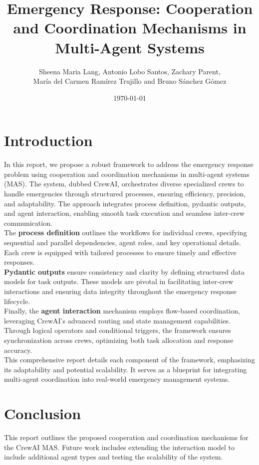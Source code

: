 \documentclass[12pt,a4paper]{article}
\title{Emergency Response: Cooperation and Coordination Mechanisms in Multi-Agent Systems}
\author{Sheena Maria Lang, Antonio Lobo Santos, Zachary Parent, \\ María del Carmen Ramírez Trujillo and Bruno Sánchez Gómez}
\date{\today}
\begin{document}
\maketitle
\tableofcontents
\newpage

\section{Introduction}
In this report, we propose a robust framework to address the emergency response problem using cooperation and coordination
 mechanisms in multi-agent systems (MAS). The system, dubbed CrewAI, orchestrates diverse specialized crews to handle emergencies
  through structured processes, ensuring efficiency, precision, and adaptability. The approach integrates process definition, 
  pydantic outputs, and agent interaction, enabling smooth task execution and seamless inter-crew communication.
\\

The \textbf{process definition} outlines the workflows for individual crews, specifying sequential and parallel dependencies, agent roles,
 and key operational details. Each crew is equipped with tailored processes to ensure timely and effective responses.
\\ 

\textbf{Pydantic outputs} ensure consistency and clarity by defining structured data models for task outputs. These models are
 pivotal in facilitating inter-crew interactions and ensuring data integrity throughout the emergency response lifecycle.
\\ 

Finally, the \textbf{agent interaction} mechanism employs flow-based coordination, leveraging CrewAI’s advanced routing and state 
management capabilities. Through logical operators and conditional triggers, the framework ensures synchronization across crews, 
optimizing both task allocation and response accuracy.
\\ 

This comprehensive report details each component of the framework, emphasizing its adaptability and potential scalability. 
It serves as a blueprint for integrating multi-agent coordination into real-world emergency management systems.











\section{Conclusion}
This report outlines the proposed cooperation and coordination mechanisms for the CrewAI MAS. Future work includes extending the interaction model to include additional agent types and testing the scalability of the system.
\end{document}
